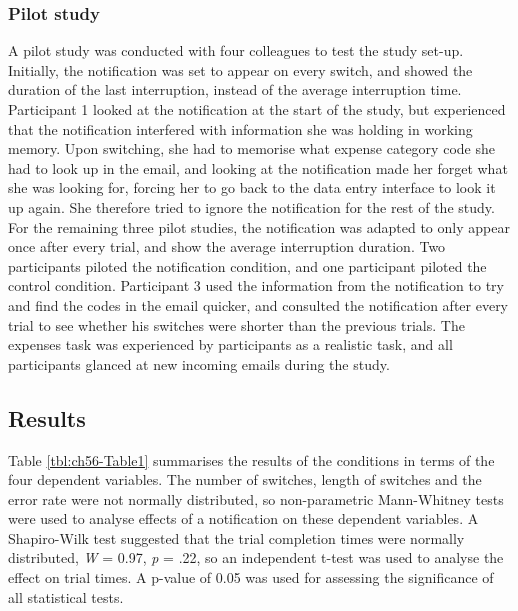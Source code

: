 \subsubsection{Pilot study}
A pilot study was conducted with four colleagues to test the study set-up. Initially, the notification was set to appear on every switch, and showed the duration of the last interruption, instead of the average interruption time. Participant 1 looked at the notification at the start of the study, but experienced that the notification interfered with information she was holding in working memory. Upon switching, she had to memorise what expense category code she had to look up in the email, and looking at the notification made her forget what she was looking for, forcing her to go back to the data entry interface to look it up again. She therefore tried to ignore the notification for the rest of the study. For the remaining three pilot studies, the notification was adapted to only appear once after every trial, and show the average interruption duration. Two participants piloted the notification condition, and one participant piloted the control condition. Participant 3 used the information from the notification to try and find the codes in the email quicker, and consulted the notification after every trial to see whether his switches were shorter than the previous trials. The expenses task was experienced by participants as a realistic task, and all participants glanced at new incoming emails during the study.

\subsection{Results}
Table \ref{tbl:ch56-Table1} summarises the results of the conditions in terms of the four dependent variables. The number of switches, length of switches and the error rate were not normally distributed, so non-parametric Mann-Whitney tests were used to analyse effects of a notification on these dependent variables. A Shapiro-Wilk test suggested that the trial completion times were normally distributed, \textit{W} = 0.97, \textit{p} = .22, so an independent t-test was used to analyse the effect on trial times. A p-value of 0.05 was used for assessing the significance of all statistical tests. 

